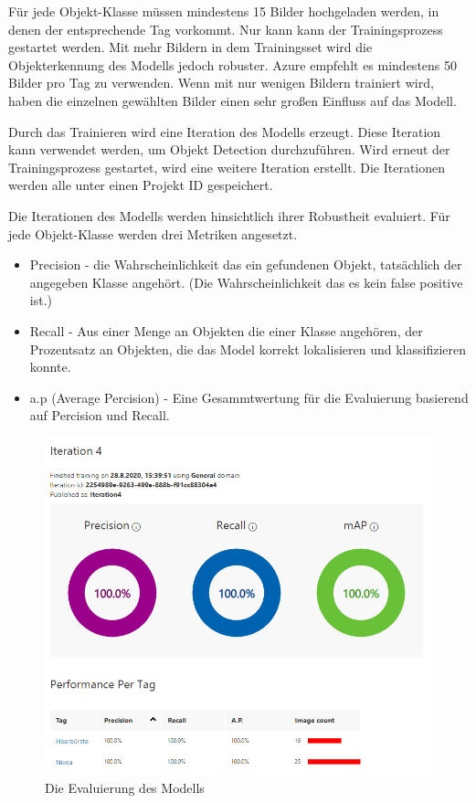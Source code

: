 Für jede Objekt-Klasse müssen mindestens 15 Bilder hochgeladen werden, in denen der entsprechende Tag vorkommt. Nur kann kann der Trainingsprozess gestartet werden. Mit mehr Bildern in dem Trainingsset wird die Objekterkennung des Modells jedoch robuster. Azure empfehlt es mindestens 50 Bilder pro Tag zu verwenden. Wenn mit nur wenigen Bildern trainiert wird, haben die einzelnen gewählten Bilder einen sehr großen Einfluss auf das Modell.

Durch das Trainieren wird eine Iteration des Modells erzeugt. Diese Iteration kann verwendet werden, um Objekt Detection durchzuführen. Wird erneut der Trainingsprozess gestartet, wird eine weitere Iteration erstellt. Die Iterationen werden alle unter einen Projekt ID gespeichert.

Die Iterationen des Modells werden hinsichtlich ihrer Robustheit evaluiert. Für jede Objekt-Klasse werden drei Metriken angesetzt. 
\begin{itemize}
	\item Precision - die Wahrscheinlichkeit das ein gefundenen Objekt, tatsächlich der angegeben Klasse angehört. (Die Wahrscheinlichkeit das es kein false positive ist.)
	\item Recall - Aus einer Menge an Objekten die einer Klasse angehören, der Prozentsatz an Objekten, die das Model korrekt lokalisieren und klassifizieren konnte.
	\item a.p (Average Percision) - Eine Gesammtwertung für die Evaluierung basierend auf Percision und Recall. 
\end{itemize}

\begin{figure}[H]
	\centering
	\includegraphics[width=1\textwidth]{images/trainingevaluation.png}
	\caption[]{Die Evaluierung des Modells}
	\label{img:trainineval}
\end{figure}

